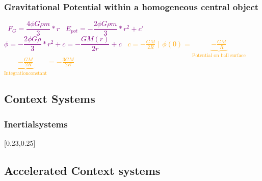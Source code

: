 \documentclass[main.tex,fontsize=8pt,paper=a4,paper=portrait,DIV=calc,]{scrartcl}
\begin{document}
\begin{multicols*}{2}
\subsubsection{Gravitational Potential within a homogeneous central object}
\, \newline
\large \textcolor{purple}{\( F_G = \dfrac{4 \phi G \rho m}{3} * r \)}\newline
\, \newline
\large \textcolor{purple}{\( E_{pot} = -\dfrac{2\phi G \rho m}{3}* r^2 + c' \)}\newline
\, \newline
\large \textcolor{purple}{\( \phi = -\dfrac{2\phi G \rho}{3}* r^2 + c = - \dfrac{GM(r)}{2r} + c\)}\newline
\, \newline
\large \textcolor{orange}{\(
  c = -\frac{GM}{2R} \text{ | } \phi\left(0\right) = \underbrace{-\frac{GM}{R}}_{\text{Potential on ball surface}}\) \newline \(\underbrace{-\frac{GM}{2R}}_{\text{Integrationconstant}}= -\frac{3GM}{2R}
 \)}
\normalsize

\subsection{Context Systems}

\subsubsection{Inertialsystems}
[0.23,0.25]

\subsection{Accelerated Context systems}

\end{multicols*}
\end{document}
